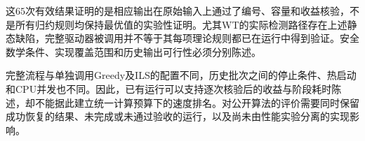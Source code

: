 这$65$次有效结果证明的是相应输出在原始输入上通过了编号、容量和收益核验，不是所有归约规则均保持最优值的实验性证明。尤其WT的实际检测路径存在上述静态缺陷，完整驱动器被调用并不等于其每项理论规则都已在运行中得到验证。安全数学条件、实现覆盖范围和历史输出可行性必须分别陈述。

完整流程与单独调用Greedy及ILS的配置不同，历史批次之间的停止条件、热启动和CPU并发也不同。因此，已有运行可以支持逐次核验后的收益与阶段耗时陈述，却不能据此建立统一计算预算下的速度排名。对公开算法的评价需要同时保留成功恢复的结果、未完成或未通过验收的运行，以及尚未由性能实验分离的实现影响。
